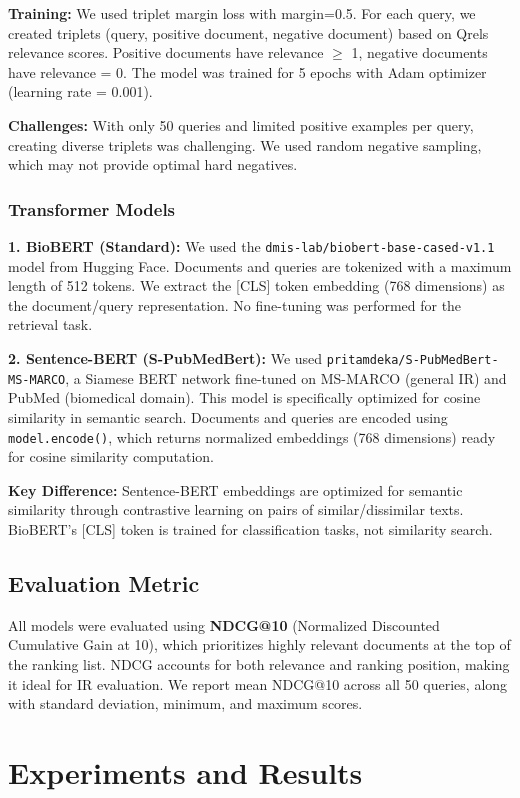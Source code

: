 \documentclass[sigconf,nonacm]{acmart}
\begin{document}
\textbf{Training:} We used triplet margin loss with margin=0.5. For each query, we created triplets (query, positive document, negative document) based on Qrels relevance scores. Positive documents have relevance $\geq$ 1, negative documents have relevance = 0. The model was trained for 5 epochs with Adam optimizer (learning rate = 0.001).

\textbf{Challenges:} With only 50 queries and limited positive examples per query, creating diverse triplets was challenging. We used random negative sampling, which may not provide optimal hard negatives.

\subsubsection{Transformer Models}

\textbf{1. BioBERT (Standard):} We used the \texttt{dmis-lab/biobert-base-cased-v1.1} model from Hugging Face. Documents and queries are tokenized with a maximum length of 512 tokens. We extract the [CLS] token embedding (768 dimensions) as the document/query representation. No fine-tuning was performed for the retrieval task.

\textbf{2. Sentence-BERT (S-PubMedBert):} We used \texttt{pritamdeka/S-PubMedBert-MS-MARCO}, a Siamese BERT network fine-tuned on MS-MARCO (general IR) and PubMed (biomedical domain). This model is specifically optimized for cosine similarity in semantic search. Documents and queries are encoded using \texttt{model.encode()}, which returns normalized embeddings (768 dimensions) ready for cosine similarity computation.

\textbf{Key Difference:} Sentence-BERT embeddings are optimized for semantic similarity through contrastive learning on pairs of similar/dissimilar texts. BioBERT's [CLS] token is trained for classification tasks, not similarity search.

\subsection{Evaluation Metric}
All models were evaluated using \textbf{NDCG@10} (Normalized Discounted Cumulative Gain at 10), which prioritizes highly relevant documents at the top of the ranking list. NDCG accounts for both relevance and ranking position, making it ideal for IR evaluation. We report mean NDCG@10 across all 50 queries, along with standard deviation, minimum, and maximum scores.

\section{Experiments and Results}
\end{document}
